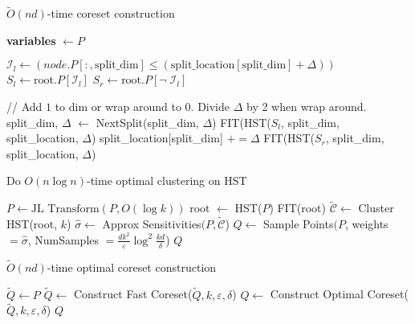 \documentclass{article}
\theoremstyle{definition}
\begin{document}
\begin{algorithm}
\caption{$\tilde{O}(nd)$-time coreset construction}
\label{fast_coreset_alg}
\begin{algorithmic}[1]

    \item[]
        \State \textbf{variables} $\gets P$
    \EndClass

    \item[]
        \State \Return
    \EndIf
    \State $\mathcal{I}_l \gets \left( node.P[:, \text{split\_dim}] \leq (\text{split\_location}[\text{split\_dim}] + \Delta) \right)$
    \State $S_l \gets \text{root}.P[\mathcal{I}_l]$
    \State $S_r \gets \text{root}.P[\lnot \; \mathcal{I}_l]$
    \item[]
    \State // Add $1$ to dim or wrap around to 0. Divide $\Delta$ by 2 when wrap around.
    \State split\_dim, $\Delta$ $\gets$ NextSplit(split\_dim, $\Delta$) 
    \State FIT(HST($S_l$, split\_dim, split\_location, $\Delta$)
    \State split\_location[split\_dim] $+= \Delta$
    \State FIT(HST($S_r$, split\_dim, split\_location, $\Delta$)
    \EndFunction
    \item[]

    \State Do $O(n\log n)$-time optimal clustering on HST
    \EndFunction
    \item[]

    \State $P \gets \text{JL Transform}(P, O(\log k))$
    \State root $ \gets$ HST($P$)
    \State FIT(root)
    \State $\tilde{\mathcal{C}} \gets $ Cluster HST(root, $k$)
    \State $\hat{\sigma} \gets $ Approx Sensitivities$(P, \tilde{\mathcal{C}}$)
    \State $Q \gets $ Sample Points$(P$, weights $=\hat{\sigma}$, NumSamples $=\frac{dk^2}{\varepsilon} \log ^2 \frac{kd}{\delta}$)
    \State \Return $Q$
\EndFunction
    
\end{algorithmic}
\end{algorithm}

\begin{algorithm}
\caption{$\tilde{O}(nd)$-time optimal coreset construction}
\label{full_coreset_alg}
\begin{algorithmic}[1]
    \State $\tilde{Q} \gets P$
        \State $\tilde{Q} \gets$ Construct Fast Coreset($\tilde{Q}, k, \varepsilon, \delta$)
    \EndWhile
    \State $Q \gets$ Construct Optimal Coreset($\tilde{Q}, k, \varepsilon, \delta$)
    \State \Return $Q$
    \EndFunction
\end{algorithmic}
\end{algorithm}
\end{document}
